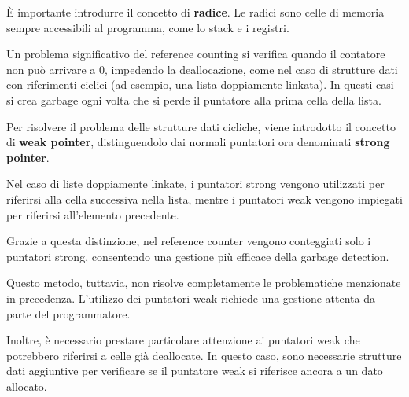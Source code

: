 \documentclass{article}
\begin{document}
È importante introdurre il concetto di \textbf{radice}. Le radici sono celle di memoria sempre accessibili al programma, come lo stack e i registri.

Un problema significativo del reference counting si verifica quando il contatore non può arrivare a 0, impedendo la deallocazione, come nel caso di strutture dati con riferimenti ciclici (ad esempio, una lista doppiamente linkata). In questi casi si crea garbage ogni volta che si perde il puntatore alla prima cella della lista.

Per risolvere il problema delle strutture dati cicliche, viene introdotto il concetto di \textbf{weak pointer}, distinguendolo dai normali puntatori ora denominati \textbf{strong pointer}.

Nel caso di liste doppiamente linkate, i puntatori strong vengono utilizzati per riferirsi alla cella successiva nella lista, mentre i puntatori weak vengono impiegati per riferirsi all'elemento precedente.

Grazie a questa distinzione, nel reference counter vengono conteggiati solo i puntatori strong, consentendo una gestione più efficace della garbage detection.

Questo metodo, tuttavia, non risolve completamente le problematiche menzionate in precedenza. L'utilizzo dei puntatori weak richiede una gestione attenta da parte del programmatore. 

Inoltre, è necessario prestare particolare attenzione ai puntatori weak che potrebbero riferirsi a celle già deallocate. In questo caso, sono necessarie strutture dati aggiuntive per verificare se il puntatore weak si riferisce ancora a un dato allocato.
\end{document}
